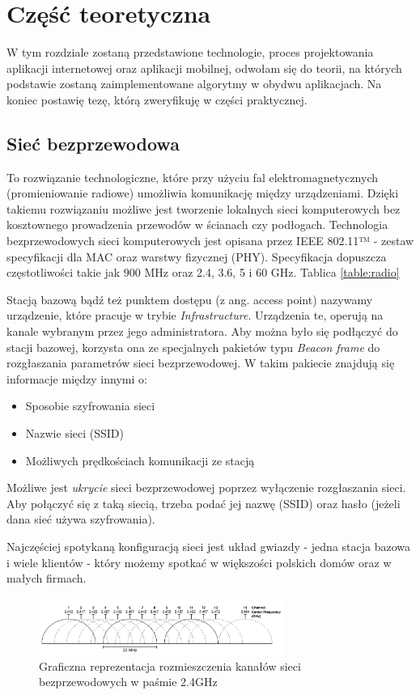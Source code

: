 \chapter{Część teoretyczna}

W tym rozdziale zostaną przedstawione technologie, proces projektowania aplikacji internetowej oraz aplikacji mobilnej, odwołam się do teorii, na których podstawie zostaną zaimplementowane algorytmy w obydwu aplikacjach. Na koniec postawię tezę, którą zweryfikuję w części praktycznej.

\section{Sieć bezprzewodowa}
To rozwiązanie technologiczne, które przy użyciu fal elektromagnetycznych (promieniowanie radiowe) umożliwia komunikację między urządzeniami. Dzięki takiemu rozwiązaniu możliwe jest tworzenie lokalnych sieci komputerowych bez kosztownego prowadzenia przewodów w ścianach czy podłogach. Technologia bezprzewodowych sieci komputerowych jest opisana przez IEEE 802.11™ - zestaw specyfikacji dla MAC oraz warstwy fizycznej (PHY). Specyfikacja dopuszcza częstotliwości takie jak 900 MHz oraz 2.4, 3.6, 5 i 60 GHz. Tablica \ref{table:radio}

Stacją bazową bądź też punktem dostępu (z ang. access point) nazywamy urządzenie, które pracuje w trybie \textit{Infrastructure}. Urządzenia te, operują na kanale wybranym przez jego administratora. Aby można było się podłączyć do stacji bazowej, korzysta ona ze specjalnych pakietów typu \textit{Beacon frame} do rozgłaszania parametrów sieci bezprzewodowej. W takim pakiecie znajdują się informacje między innymi o:
\begin{itemize}
    \item Sposobie szyfrowania sieci
    \item Nazwie sieci (SSID)
    \item Możliwych prędkościach komunikacji ze stacją
\end{itemize}

Możliwe jest \textit{ukrycie} sieci bezprzewodowej poprzez wyłączenie rozgłaszania sieci. Aby połączyć się z taką siecią, trzeba podać jej nazwę (SSID) oraz hasło (jeżeli dana sieć używa szyfrowania).

Najczęściej spotykaną konfiguracją sieci jest układ gwiazdy - jedna stacja bazowa i wiele klientów - który możemy spotkać w większości polskich domów oraz w małych firmach.

\begin{figure}[h!]
  \centering
    \includegraphics[width=8cm]{images/wifi_channels}
  \caption{Graficzna reprezentacja rozmieszczenia kanałów sieci bezprzewodowych w paśmie 2.4GHz}
  \label{fig:wifiChannels}
\end{figure}

